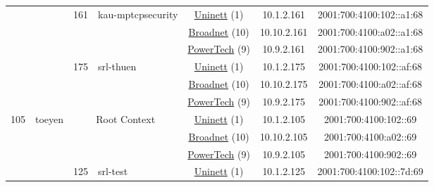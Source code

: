 \begin{small}
\begin{center}
\begin{longtable}{|c|c|c|c|c|c|c|c|}
  &  & \multirow{3}{*}{\tiny{161}} & \multicolumn{1}{|l|}{\multirow{3}{*}{\tiny{kau-mptcpsecurity}}} & \multicolumn{2}{|c|}{\tiny{\href{https://www.uninett.no}{Uninett} (1)}} & \tiny{10.1.2.161} & \tiny{2001:700:4100:102::a1:68} \\* \cline{5-5}\cline{6-6}\cline{7-7}\cline{8-8}
  &  &  &  & \multicolumn{2}{|c|}{\tiny{\href{https://www.broadnet.no}{Broadnet} (10)}} & \tiny{10.10.2.161} & \tiny{2001:700:4100:a02::a1:68} \\* \cline{5-5}\cline{6-6}\cline{7-7}\cline{8-8}
  &  &  &  & \multicolumn{2}{|c|}{\tiny{\href{http://www.powertech.no}{PowerTech} (9)}} & \tiny{10.9.2.161} & \tiny{2001:700:4100:902::a1:68} \\* \cline{3-3}\cline{4-4}\cline{5-5}\cline{6-6}\cline{7-7}\cline{8-8}
  &  & \multirow{3}{*}{\tiny{175}} & \multicolumn{1}{|l|}{\multirow{3}{*}{\tiny{srl-thuen}}} & \multicolumn{2}{|c|}{\tiny{\href{https://www.uninett.no}{Uninett} (1)}} & \tiny{10.1.2.175} & \tiny{2001:700:4100:102::af:68} \\* \cline{5-5}\cline{6-6}\cline{7-7}\cline{8-8}
  &  &  &  & \multicolumn{2}{|c|}{\tiny{\href{https://www.broadnet.no}{Broadnet} (10)}} & \tiny{10.10.2.175} & \tiny{2001:700:4100:a02::af:68} \\* \cline{5-5}\cline{6-6}\cline{7-7}\cline{8-8}
  &  &  &  & \multicolumn{2}{|c|}{\tiny{\href{http://www.powertech.no}{PowerTech} (9)}} & \tiny{10.9.2.175} & \tiny{2001:700:4100:902::af:68} \\ \hline
 \multirow{30}{*}{\tiny{105}} & \multicolumn{1}{|l|}{\multirow{30}{*}{\tiny{toeyen}}} & \multicolumn{2}{|c|}{\multirow{3}{*}{\tiny{Root Context}}} & \multicolumn{2}{|c|}{\tiny{\href{https://www.uninett.no}{Uninett} (1)}} & \tiny{10.1.2.105} & \tiny{2001:700:4100:102::69} \\* \cline{5-5}\cline{6-6}\cline{7-7}\cline{8-8}
  &  & \multicolumn{2}{|c|}{} & \multicolumn{2}{|c|}{\tiny{\href{https://www.broadnet.no}{Broadnet} (10)}} & \tiny{10.10.2.105} & \tiny{2001:700:4100:a02::69} \\* \cline{5-5}\cline{6-6}\cline{7-7}\cline{8-8}
  &  & \multicolumn{2}{|c|}{} & \multicolumn{2}{|c|}{\tiny{\href{http://www.powertech.no}{PowerTech} (9)}} & \tiny{10.9.2.105} & \tiny{2001:700:4100:902::69} \\* \cline{3-3}\cline{4-4}\cline{5-5}\cline{6-6}\cline{7-7}\cline{8-8}
  &  & \multirow{3}{*}{\tiny{125}} & \multicolumn{1}{|l|}{\multirow{3}{*}{\tiny{srl-test}}} & \multicolumn{2}{|c|}{\tiny{\href{https://www.uninett.no}{Uninett} (1)}} & \tiny{10.1.2.125} & \tiny{2001:700:4100:102::7d:69} \\* \cline{5-5}\cline{6-6}\cline{7-7}\cline{8-8}

\end{longtable}
\end{center}
\end{small}
